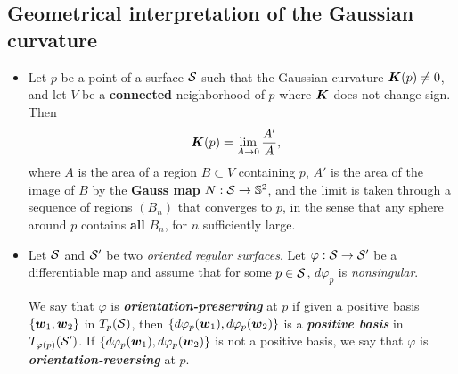 \documentclass[11pt]{article}
\begin{document}
\subsection{Geometrical interpretation of the Gaussian curvature}
\begin{itemize}
\item \begin{proposition}
Let $p$ be a point of a surface ${\mathcal S}$ such that the Gaussian curvature $\boldsymbol{K}(p) \neq 0$, and let $V$ be a \textbf{connected} neighborhood of $p$ where $\boldsymbol{K}$ does not change sign. Then
\begin{align*}
\boldsymbol{K}(p) &= \lim_{A\rightarrow 0}\frac{A'}{A}, 
\end{align*}
where $A$ is the area of a region $B \subset V$ containing $p$, $A'$ is the area of the image of $B$ by the \textbf{Gauss map} $N: {\mathcal S} \rightarrow {\mathbb S}^2$, and the limit is taken through a sequence of regions $(B_n)$ that converges to $p$, in the sense that any sphere around $p$ contains \textbf{all} $B_n$, for $n$ sufficiently large.
\end{proposition}

\item \begin{definition}
Let ${\mathcal S}$ and ${\mathcal S}'$ be two \emph{oriented regular surfaces}. Let $\varphi: {\mathcal S} \rightarrow {\mathcal S} '$ be a differentiable map and assume that for some $p \in {\mathcal S}$, $d\varphi_{p}$ is \emph{nonsingular}. 

We say that $\varphi$ is \emph{\textbf{orientation-preserving}} at $p$ if given a positive basis $\left\{\boldsymbol{w}_1 , \boldsymbol{w}_2\right\}$ in $T_{p}({\mathcal S})$, then $\left\{d\varphi_{p}(\boldsymbol{w}_1), d\varphi_{p}(\boldsymbol{w}_2)\right\}$ is a \emph{\textbf{positive basis}} in $T_{\varphi(p)}({\mathcal S}')$. If $\left\{d\varphi_{p}(\boldsymbol{w}_1), d\varphi_{p}(\boldsymbol{w}_2)\right\}$ is not a positive basis, we say that $\varphi$ is \emph{\textbf{orientation-reversing}} at $p$.
\end{definition}


\end{itemize}
\end{document}
